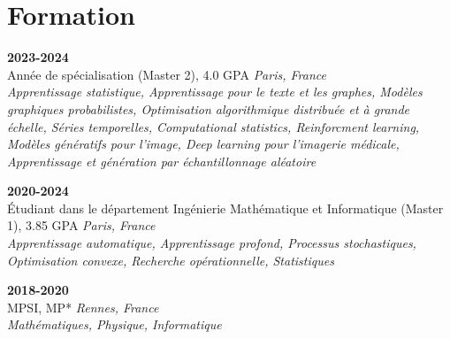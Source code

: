 \section{Formation}
\vspace{0.1cm}

  \hfill \textbf{2023-2024}\\
Année de spécialisation (Master 2), 4.0 GPA \hfill \textit{Paris, France}\\
\textit{Apprentissage statistique, Apprentissage pour le texte et les graphes, Modèles graphiques probabilistes, Optimisation algorithmique distribuée et à grande échelle, Séries temporelles, Computational statistics, Reinforcment learning, Modèles génératifs pour l'image, Deep learning pour l'imagerie médicale, Apprentissage et génération par échantillonnage aléatoire}

\vspace{0.1cm}

  \hfill \textbf{2020-2024}\\
Étudiant dans le département Ingénierie Mathématique et Informatique (Master 1), 3.85 GPA \hfill \textit{Paris, France}\\
\textit{Apprentissage automatique, Apprentissage profond, Processus stochastiques, Optimisation convexe, Recherche opérationnelle, Statistiques}

\vspace{0.1cm}

 \hfill \textbf{2018-2020}\\
MPSI, MP* \hfill \textit{Rennes, France}\\
\textit{Mathématiques, Physique, Informatique}\\
